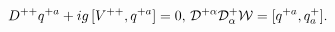 \begin{equation}\label{eg}
D^{++}q^{+a} + ig\,[V^{++},q^{+a}]=0,\,
{\cal D}^{+\alpha}{\cal D}^+_{\alpha}{\cal W}= [q^{+a},q^+_a].
\end{equation}

